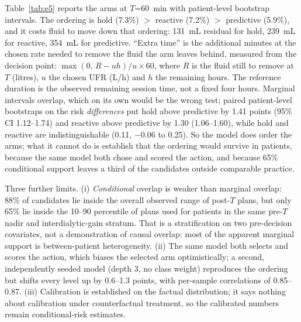 \documentclass{article}
\begin{document}
Table~\ref{tab:e5} reports the arms at $T$=60~min with patient-level bootstrap intervals. The ordering is
hold (7.3\%) $>$ reactive (7.2\%) $>$ predictive (5.9\%), and it costs fluid to move down that ordering: 131~mL residual for
hold, 239~mL for reactive, 354~mL for predictive. ``Extra time'' is the additional minutes at the chosen rate needed to remove
the fluid the arm leaves behind, measured from the decision point: $\max(0,\,R-uh)/u \times 60$, where $R$ is the fluid still to
remove at $T$ (litres), $u$ the chosen UFR (L/h) and $h$ the remaining hours. The reference duration is the observed remaining
session time, not a fixed four hours. Marginal intervals overlap, which on its own would be the wrong test; paired patient-level bootstraps
on the risk \emph{differences} put hold above predictive by 1.41 points (95\% CI 1.12--1.74) and reactive above predictive by
1.30 (1.06--1.60), while hold and reactive are indistinguishable (0.11, $-0.06$ to 0.25). So the model does order the arms;
what it cannot do is establish that the ordering would survive in patients, because the same model both chose and scored the
action, and because 65\% conditional support leaves a third of the candidates outside comparable practice.

Three further limits. (i) \emph{Conditional} overlap is weaker than marginal overlap: 88\% of candidates lie inside the
overall observed range of post-$T$ plans, but only 65\% lie inside the 10--90 percentile of plans used for patients in the
same pre-$T$ nadir and interdialytic-gain stratum. That is a stratification on two pre-decision covariates, not a
demonstration of causal overlap: most of the apparent marginal support is between-patient heterogeneity. (ii) The
same model both selects and scores the action, which biases the selected arm optimistically; a second, independently seeded
model (depth 3, no class weight) reproduces the ordering but shifts every level up by 0.6--1.3 points, with per-sample
correlations of 0.85--0.87. (iii) Calibration is established on the factual distribution; it says nothing about calibration
under counterfactual treatment, so the calibrated numbers remain conditional-risk estimates.
\end{document}
